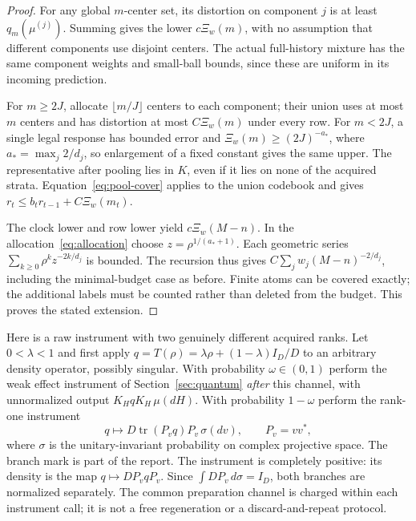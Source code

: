 \begin{proof}
For any global $m$-center set, its distortion on component $j$ is at least $q_m(\mu^{(j)})$. Summing gives the lower $c\Xi_w(m)$, with no assumption that different components use disjoint centers. The actual full-history mixture has the same component weights and small-ball bounds, since these are uniform in its incoming prediction.

For $m\ge2J$, allocate $\lfloor m/J\rfloor$ centers to each component; their union uses at most $m$ centers and has distortion at most $C\Xi_w(m)$ under every row. For $m<2J$, a single legal response has bounded error and $\Xi_w(m)\ge(2J)^{-a_*}$, where $a_*=\max_j2/d_j$, so enlargement of a fixed constant gives the same upper. The representative after pooling lies in $K$, even if it lies on none of the acquired strata. Equation~\eqref{eq:pool-cover} applies to the union codebook and gives
$r_t\le b_t r_{t-1}+C\Xi_w(m_t)$.

The clock lower and row lower yield $c\Xi_w(M-n)$. In the allocation~\eqref{eq:allocation} choose $z=\rho^{1/(a_*+1)}$. Each geometric series $\sum_{k\ge0}\rho^kz^{-2k/d_j}$ is bounded. The recursion thus gives $C\sum_jw_j(M-n)^{-2/d_j}$, including the minimal-budget case as before. Finite atoms can be covered exactly; the additional labels must be counted rather than deleted from the budget. This proves the stated extension.
\end{proof}

Here is a raw instrument with two genuinely different acquired ranks. Let $0<\lambda<1$ and first apply
$q=T(\rho)=\lambda\rho+(1-\lambda)I_D/D$ to an arbitrary density operator, possibly singular. With probability $\omega\in(0,1)$ perform the weak effect instrument of Section~\ref{sec:quantum} \emph{after} this channel, with unnormalized output $K_HqK_H\,\mu(dH)$. With probability $1-\omega$ perform the rank-one instrument
\begin{equation}\label{eq:pure-instrument}
 q\longmapsto D\operatorname{tr}(P_vq)P_v\,\sigma(dv),
 \qquad P_v=vv^*,
\end{equation}
where $\sigma$ is the unitary-invariant probability on complex projective space. The branch mark is part of the report. The instrument is completely positive: its density is the map $q\mapsto D P_vqP_v$. Since $\int D P_v\,d\sigma=I_D$, both branches are normalized separately. The common preparation channel is charged within each instrument call; it is not a free regeneration or a discard-and-repeat protocol.

